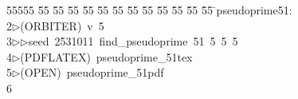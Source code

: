 %
%
\begin{tabbing}
55555 \= 55 \= 55 \= 55 \= 55 \= 55 \= 55 \= 55 \= 55 \= 55 \= 55 \= 55 \= 55 \= \>pseudoprime51:\\[0pt]
2\>$\triangleright$\>(ORBITER)\ v\ 5\ \\[0pt]
3\>$\triangleright$\>$\triangleright$\>seed\ 2531011\ find\_pseudoprime\ 51\ 5\ 5\ 5\ \\[0pt]
4\>$\triangleright$\>(PDFLATEX)\ pseudoprime\_51tex\\[0pt]
5\>$\triangleright$\>(OPEN)\ pseudoprime\_51pdf\\[0pt]
6\>\end{tabbing}
